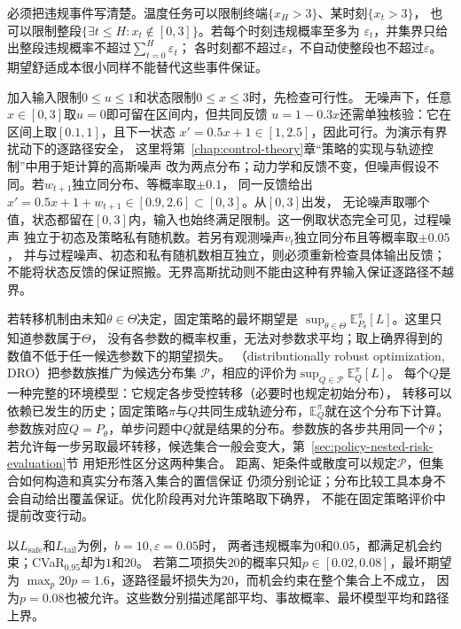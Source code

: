 必须把违规事件写清楚。温度任务可以限制终端$\{x_H>3\}$、某时刻$\{x_t>3\}$，
也可以限制整段$\{\exists t\leq H:x_t\notin[0,3]\}$。若每个时刻违规概率至多为
$\varepsilon_t$，并集界只给出整段违规概率不超过$\sum_{t=0}^H\varepsilon_t$；
各时刻都不超过$\varepsilon$，不自动使整段也不超过$\varepsilon$。
期望舒适成本很小同样不能替代这些事件保证。

加入输入限制$0\leq u\leq1$和状态限制$0\leq x\leq3$时，先检查可行性。
无噪声下，任意$x\in[0,3]$取$u=0$即可留在区间内，但共同反馈
$u=1-0.3x$还需单独核验：它在区间上取$[0.1,1]$，且下一状态
$x'=0.5x+1\in[1,2.5]$，因此可行。为演示有界扰动下的逐路径安全，
这里将第~\ref{chap:control-theory}章“策略的实现与轨迹控制”中用于矩计算的高斯噪声
改为两点分布；动力学和反馈不变，但噪声假设不同。若$w_{t+1}$独立同分布、等概率取$\pm0.1$，
同一反馈给出$x'=0.5x+1+w_{t+1}\in[0.9,2.6]\subset[0,3]$。从$[0,3]$出发，
无论噪声取哪个值，状态都留在$[0,3]$内，输入也始终满足限制。这一例取状态完全可见，过程噪声
独立于初态及策略私有随机数。若另有观测噪声$v_t$独立同分布且等概率取$\pm0.05$，
并与过程噪声、初态和私有随机数相互独立，则必须重新检查具体输出反馈；
不能将状态反馈的保证照搬。无界高斯扰动则不能由这种有界输入保证逐路径不越界。

若转移机制由未知$\theta\in\Theta$决定，固定策略的最坏期望是
$\sup_{\theta\in\Theta}\mathbb E^\pi_{P_\theta}[L]$。这里只知道参数属于$\Theta$，
没有各参数的概率权重，无法对参数求平均；取上确界得到的数值不低于任一候选参数下的期望损失。
（distributionally robust optimization, DRO）把参数族推广为候选分布集
$\mathcal P$，相应的评价为$\sup_{Q\in\mathcal P}\mathbb E^\pi_Q[L]$。
每个$Q$是一种完整的环境模型：它规定各步受控转移（必要时也规定初始分布），
转移可以依赖已发生的历史；固定策略$\pi$与$Q$共同生成轨迹分布，$\mathbb E^\pi_Q$就在这个分布下计算。
参数族对应$Q=P_\theta$，单步问题中$Q$就是结果的分布。参数族的各步共用同一个$\theta$；
若允许每一步另取最坏转移，候选集合一般会变大，第~\ref{sec:policy-nested-risk-evaluation}节
用矩形性区分这两种集合。
距离、矩条件或散度可以规定$\mathcal P$，但集合如何构造和真实分布落入集合的置信保证
仍须分别论证；分布比较工具本身不会自动给出覆盖保证。优化阶段再对允许策略取下确界，
不能在固定策略评价中提前改变行动。

以$L_{\mathrm{safe}}$和$L_{\mathrm{tail}}$为例，$b=10,\varepsilon=0.05$时，
两者违规概率为$0$和$0.05$，都满足机会约束；CVaR$_{0.95}$却为$1$和$20$。
若第二项损失$20$的概率只知$p\in[0.02,0.08]$，最坏期望为
$\max_p20p=1.6$，逐路径最坏损失为$20$，而机会约束在整个集合上不成立，
因为$p=0.08$也被允许。这些数分别描述尾部平均、事故概率、最坏模型平均和路径上界。

